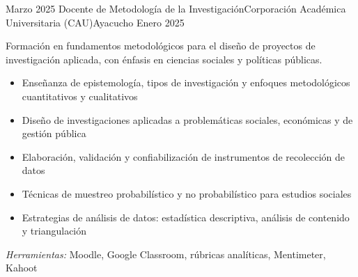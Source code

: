 \experience
{Marzo 2025} {Docente de Metodología de la Investigación}{Corporación Académica Universitaria (CAU)}{Ayacucho}
{Enero 2025} {
	Formación en fundamentos metodológicos para el diseño de proyectos de investigación aplicada, con énfasis en ciencias sociales y políticas públicas.
	\begin{itemize}
		\item Enseñanza de epistemología, tipos de investigación y enfoques metodológicos cuantitativos y cualitativos
		\item Diseño de investigaciones aplicadas a problemáticas sociales, económicas y de gestión pública
		\item Elaboración, validación y confiabilización de instrumentos de recolección de datos
		\item Técnicas de muestreo probabilístico y no probabilístico para estudios sociales
		\item Estrategias de análisis de datos: estadística descriptiva, análisis de contenido y triangulación
	\end{itemize}
}
{\footnotesize{\emph{Herramientas:} Moodle, Google Classroom, rúbricas analíticas, Mentimeter, Kahoot}}
